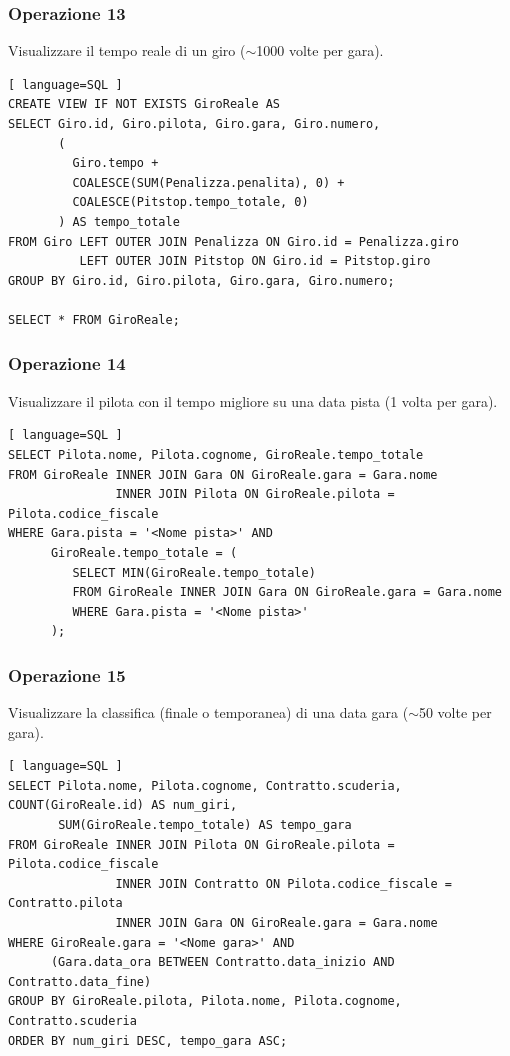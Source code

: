 \documentclass[11pt]{article}
\begin{document}
\subsubsection{Operazione 13}
Visualizzare il tempo reale di un giro ($\sim$1000 volte per gara).
\begin{lstlisting}[ language=SQL ]
CREATE VIEW IF NOT EXISTS GiroReale AS
SELECT Giro.id, Giro.pilota, Giro.gara, Giro.numero, 
       (
         Giro.tempo + 
         COALESCE(SUM(Penalizza.penalita), 0) + 
         COALESCE(Pitstop.tempo_totale, 0)
       ) AS tempo_totale
FROM Giro LEFT OUTER JOIN Penalizza ON Giro.id = Penalizza.giro
          LEFT OUTER JOIN Pitstop ON Giro.id = Pitstop.giro
GROUP BY Giro.id, Giro.pilota, Giro.gara, Giro.numero;

SELECT * FROM GiroReale;
\end{lstlisting}


\subsubsection{Operazione 14}
Visualizzare il pilota con il tempo migliore su una data pista (1 volta per gara).
\begin{lstlisting}[ language=SQL ]
SELECT Pilota.nome, Pilota.cognome, GiroReale.tempo_totale
FROM GiroReale INNER JOIN Gara ON GiroReale.gara = Gara.nome
               INNER JOIN Pilota ON GiroReale.pilota = Pilota.codice_fiscale
WHERE Gara.pista = '<Nome pista>' AND
      GiroReale.tempo_totale = (
         SELECT MIN(GiroReale.tempo_totale)
         FROM GiroReale INNER JOIN Gara ON GiroReale.gara = Gara.nome
         WHERE Gara.pista = '<Nome pista>'
      );
\end{lstlisting}


\subsubsection{Operazione 15}
Visualizzare la classifica (finale o temporanea) di una data gara ($\sim$50 volte per gara).
\begin{lstlisting}[ language=SQL ]
SELECT Pilota.nome, Pilota.cognome, Contratto.scuderia, COUNT(GiroReale.id) AS num_giri, 
       SUM(GiroReale.tempo_totale) AS tempo_gara
FROM GiroReale INNER JOIN Pilota ON GiroReale.pilota = Pilota.codice_fiscale
               INNER JOIN Contratto ON Pilota.codice_fiscale = Contratto.pilota
               INNER JOIN Gara ON GiroReale.gara = Gara.nome
WHERE GiroReale.gara = '<Nome gara>' AND
      (Gara.data_ora BETWEEN Contratto.data_inizio AND Contratto.data_fine)
GROUP BY GiroReale.pilota, Pilota.nome, Pilota.cognome, Contratto.scuderia
ORDER BY num_giri DESC, tempo_gara ASC;
\end{lstlisting}
\end{document}
